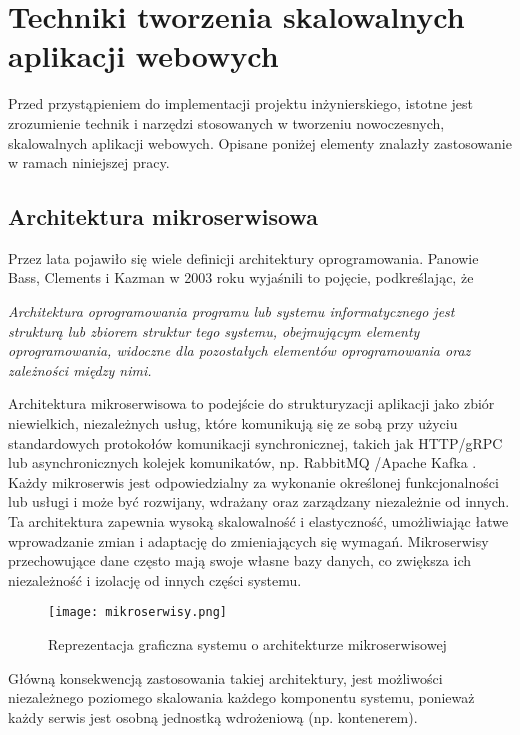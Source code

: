 \clearpage
\section{Techniki tworzenia skalowalnych aplikacji webowych}

Przed przystąpieniem do implementacji projektu inżynierskiego, istotne jest zrozumienie technik i narzędzi stosowanych w tworzeniu nowoczesnych, skalowalnych aplikacji webowych. Opisane poniżej elementy znalazły zastosowanie w ramach niniejszej pracy.

\subsection{Architektura mikroserwisowa}

Przez lata pojawiło się wiele definicji architektury oprogramowania. Panowie Bass, Clements i Kazman w 2003 roku \cite{bass2012software} wyjaśnili to pojęcie, podkreślając, że

\begin{displayquote}
\emph{Architektura oprogramowania programu lub systemu informatycznego jest strukturą lub zbiorem struktur tego systemu, obejmującym elementy oprogramowania, widoczne dla pozostałych elementów oprogramowania oraz zależności między nimi.}
\end{displayquote}

Architektura mikroserwisowa to podejście do strukturyzacji aplikacji jako zbiór niewielkich, niezależnych usług, które komunikują się ze sobą przy użyciu standardowych protokołów komunikacji synchronicznej, takich jak HTTP/gRPC \cite{grpc} lub asynchronicznych kolejek komunikatów, np. RabbitMQ \cite{rabbitmq}/Apache Kafka \cite{kafka}. Każdy mikroserwis jest odpowiedzialny za wykonanie określonej funkcjonalności lub usługi i może być rozwijany, wdrażany oraz zarządzany niezależnie od innych. Ta architektura zapewnia wysoką skalowalność i elastyczność, umożliwiając łatwe wprowadzanie zmian i adaptację do zmieniających się wymagań. Mikroserwisy przechowujące dane często mają swoje własne bazy danych, co zwiększa ich niezależność i izolację od innych części systemu.

\begin{figure}[!h]
    \centering \texttt{[image: mikroserwisy.png]}
    \caption{Reprezentacja graficzna systemu o architekturze mikroserwisowej \cite{microservices_rys}}
\end{figure}


Główną konsekwencją zastosowania takiej architektury, jest możliwości niezależnego poziomego skalowania każdego komponentu systemu, ponieważ każdy serwis jest osobną jednostką wdrożeniową (np. kontenerem).

